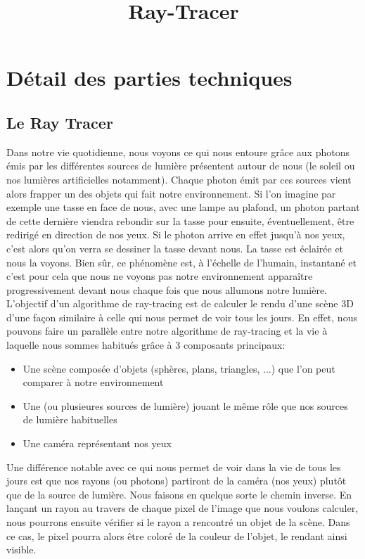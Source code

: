 \documentclass[11pt]{article}
\author{}
\title{Ray-Tracer}
\date{}
\begin{document}
\maketitle

\section{Détail des parties techniques}
\subsection{Le Ray Tracer}
Dans notre vie quotidienne, nous voyons ce qui nous entoure grâce aux photons émis par les différentes sources de lumière présentent autour de nous (le soleil ou nos lumières artificielles notamment). Chaque photon émit par ces sources vient alors frapper un des objets qui fait notre environnement. Si l'on imagine par exemple une tasse en face de nous, avec une lampe au plafond, un photon partant de cette dernière viendra rebondir sur la tasse pour ensuite, éventuellement, être redirigé en direction de nos yeux. Si le photon arrive en effet jusqu'à nos yeux, c'est alors qu'on verra se dessiner la tasse devant nous. La tasse est éclairée et nous la voyons. Bien sûr, ce phénomène est, à l'échelle de l'humain, instantané et c'est pour cela que nous ne voyons pas notre environnement apparaître progressivement devant nous chaque fois que nous allumons notre lumière. \\
L'objectif d'un algorithme de ray-tracing est de calculer le rendu d'une scène 3D d'une façon similaire à celle qui nous permet de voir tous les jours. En effet, nous pouvons faire un parallèle entre notre algorithme de ray-tracing et la vie à laquelle nous sommes habitués grâce à 3 composants principaux:
\begin{itemize}
	\item{Une scène composée d'objets (sphères, plans, triangles, ...) que l'on peut comparer à notre environnement}
	\item{Une (ou plusieures sources de lumière) jouant le même rôle que nos sources de lumière habituelles}
	\item{Une caméra représentant nos yeux}
\end{itemize}
Une différence notable avec ce qui nous permet de voir dans la vie de tous les jours est que nos rayons (ou photons) partiront de la caméra (nos yeux) plutôt que de la source de lumière. Nous faisons en quelque sorte le chemin inverse. En lançant un rayon au travers de chaque pixel de l'image que nous voulons calculer, nous pourrons ensuite vérifier si le rayon a rencontré un objet de la scène. Dans ce cas, le pixel pourra alors être coloré de la couleur de l'objet, le rendant ainsi visible.
\end{document}
